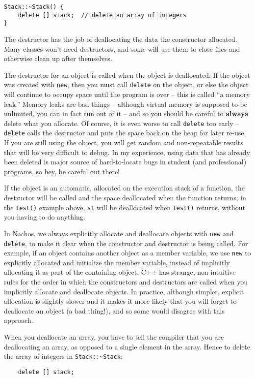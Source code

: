 \begin{enumerate}
\begin{verbatim}
Stack::~Stack() {
    delete [] stack;  // delete an array of integers
}
\end{verbatim}

The destructor has the job of deallocating the data the constructor
allocated.  Many classes won't need destructors, and some will use
them to close files and otherwise clean up after themselves.

The destructor for an object is called when the object is deallocated.
If the object was created with {\tt new}, then you must call
{\tt delete} on the object, or else the object will continue
to occupy space until the program is over -- this is called
``a memory leak.''  Memory leaks are bad things -- although virtual
memory is supposed to be unlimited, you can in fact run out of it --
and so you should be careful to {\bf always} delete what you allocate.
Of course, it is even worse to call {\tt delete} too early --
{\tt delete} calls the destructor and puts the space back on the heap
for later re-use.  If you are still using the object, you will
get random and non-repeatable results that will be very difficult
to debug.  In my experience, using data that has already been deleted
is major source of hard-to-locate bugs in student (and professional)
programs, so hey, be careful out there!

If the object is an automatic, allocated on the execution stack
of a function, the destructor will be called and the space deallocated when
the function returns; in the {\tt test()} example above, {\tt s1}
will be deallocated when {\tt test()} returns, without you having to
do anything.

In Nachos, we always explicitly allocate and deallocate objects with
{\tt new} and {\tt delete}, to make it clear when the constructor and
destructor is being called.  For example, if an object contains another
object as a member variable, we use
{\tt new} to explicitly allocated and initialize the member variable,
instead of implicitly allocating it as part of the containing object.
C++ has strange, non-intuitive rules for the order in which the
constructors and destructors are called when you implicitly allocate
and deallocate objects.  In practice, although simpler, explicit allocation
is slightly slower and it makes it more likely that you will forget
to deallocate an object (a bad thing!), and so some would disagree with
this approach.

When you deallocate an array, you have to tell the compiler that
you are deallocating an array, as opposed to a single element in the array.
Hence to delete the array of integers in {\tt Stack::{\verb^~^}Stack}:

\begin{verbatim}
    delete [] stack;
\end{verbatim}

\end{enumerate}

